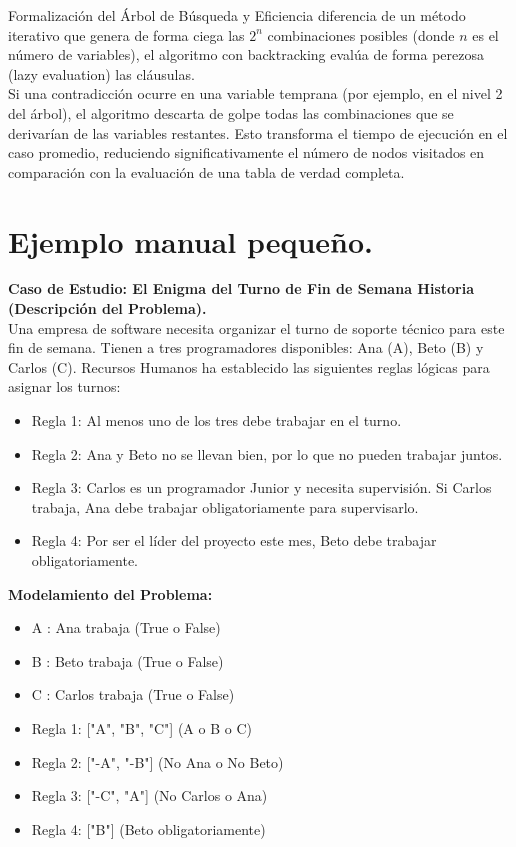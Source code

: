 \documentclass[12pt,a4paper]{article}
\begin{document}
Formalización del Árbol de Búsqueda y Eficiencia diferencia de un método iterativo que genera de forma ciega las $2^n$ combinaciones posibles (donde $n$ es el número de variables), el algoritmo con backtracking evalúa de forma perezosa (lazy evaluation) las cláusulas.\\ Si una contradicción ocurre en una variable temprana (por ejemplo, en el nivel 2 del árbol), el algoritmo descarta de golpe todas las combinaciones que se derivarían de las variables restantes. Esto transforma el tiempo de ejecución en el caso promedio, reduciendo significativamente el número de nodos visitados en comparación con la evaluación de una tabla de verdad completa.

\section{Ejemplo manual pequeño.}
\textbf{Caso de Estudio: El Enigma del Turno de Fin de Semana Historia (Descripción del Problema).}\\
Una empresa de software necesita organizar el turno de soporte técnico para este fin de semana. Tienen a tres programadores disponibles: Ana (A), Beto (B) y Carlos (C). Recursos Humanos ha establecido las siguientes reglas lógicas para asignar los turnos:

\begin{itemize}
  \item Regla 1: Al menos uno de los tres debe trabajar en el turno.
  \item Regla 2: Ana y Beto no se llevan bien, por lo que no pueden trabajar juntos.
  \item Regla 3: Carlos es un programador Junior y necesita supervisión. Si Carlos trabaja, Ana debe trabajar obligatoriamente para supervisarlo.
  \item Regla 4: Por ser el líder del proyecto este mes, Beto debe trabajar obligatoriamente.
\end{itemize}

\textbf{Modelamiento del Problema:}
\begin{itemize}
  \item A : Ana trabaja (True o False)
  \item B : Beto trabaja (True o False)
  \item C : Carlos trabaja (True o False)
\end{itemize}
\begin{itemize}
  \item Regla 1: ["A", "B", "C"] (A o B o C)
  \item Regla 2: ["-A", "-B"] (No Ana o No Beto)
  \item Regla 3: ["-C", "A"] (No Carlos o Ana)
  \item Regla 4: ["B"] (Beto obligatoriamente)
\end{itemize} 
\end{document}
